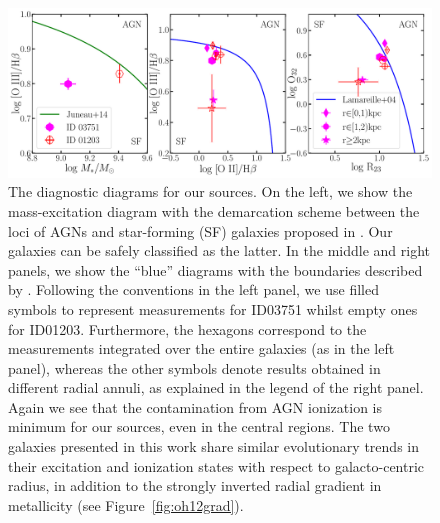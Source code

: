 \begin{figure}
    \includegraphics[width=\textwidth]{fig/bluediagram.pdf}
    \caption[The diagnostic diagrams for our sources.]{The diagnostic diagrams for our sources.
    On the left, we show the mass-excitation diagram
    with the demarcation scheme between the loci of AGNs and 
    star-forming (SF) galaxies proposed in \citet{Juneau:2014ca}. Our galaxies can be safely classified as the 
    latter.
    In the middle and right panels, we show the ``blue'' diagrams with the boundaries described by \citet{Lamareille:2004jk}.
    Following the conventions in the left panel, we use filled symbols to represent measurements for ID03751 
    whilst empty ones for ID01203.
    Furthermore, the hexagons correspond to the measurements integrated over the entire galaxies (as in the left 
    panel), whereas the other symbols denote results obtained in different radial annuli, as explained in the 
    legend of the right panel.
    Again we see that the contamination from AGN ionization is minimum for our sources, even in the central 
    regions.
    The two galaxies presented in this work share similar evolutionary trends in their excitation and ionization 
    states with respect to galacto-centric radius, in addition to the strongly inverted radial gradient in 
    metallicity (see Figure~\ref{fig:oh12grad}).
    \label{fig:bluediagram}}
\end{figure}

